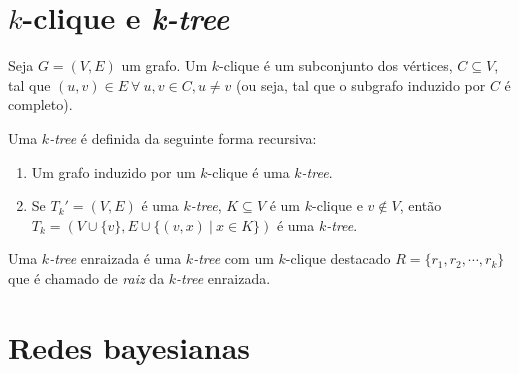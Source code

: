 \section{$k$-clique e \emph{k-tree}}

\begin{definition}[$k$-clique]
  \label{def:kclique}
  \cite{defkclique} Seja $G = (V, E)$ um grafo. Um $k$-clique é um subconjunto dos vértices, $C \subseteq V$, tal que $(u, v) \in E \ \forall \ u, v \in C, u \neq v$ (ou seja, tal que o subgrafo induzido por $C$ é completo).
\end{definition}

\begin{definition}
  \label{def:ktree}
  \cite{harary} Uma \emph{$k$-tree} é definida da seguinte forma recursiva:

  \begin{enumerate}
    \item Um grafo induzido por um $k$-clique é uma \emph{$k$-tree}.
    \item Se $T_k' = (V, E)$ é uma \emph{$k$-tree}, $K \subseteq V$ é um $k$-clique e $v \not \in V$, então $T_k = (V \cup \{v\}, E \cup \{(v,x) \ | \  x \in K\})$ é uma \emph{$k$-tree}.
  \end{enumerate}
\end{definition}

\begin{definition}
  \label{def:rootedktree}
  Uma \emph{$k$-tree} enraizada é uma \emph{$k$-tree} com um $k$-clique destacado $R = \{r_1, r_2, \cdots, r_k\}$ que é chamado de \emph{raiz} da \emph{$k$-tree} enraizada.
\end{definition}

\section{Redes bayesianas}

